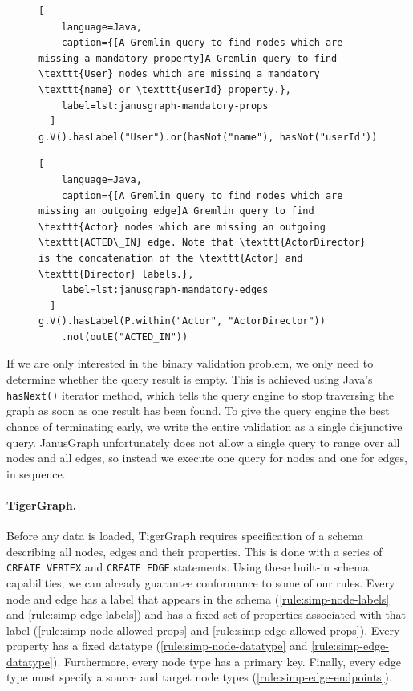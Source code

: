 \documentclass{report}
\theoremstyle{definition}
\begin{document}
\begin{figure}[H]
  \begin{lstlisting}[
    language=Java,
    caption={[A Gremlin query to find nodes which are missing a mandatory property]A Gremlin query to find \texttt{User} nodes which are missing a mandatory \texttt{name} or \texttt{userId} property.},
    label=lst:janusgraph-mandatory-props
  ]
g.V().hasLabel("User").or(hasNot("name"), hasNot("userId"))
  \end{lstlisting}
\end{figure}
\vspace*{-8pt}
\begin{figure}[H]
  \begin{lstlisting}[
    language=Java,
    caption={[A Gremlin query to find nodes which are missing an outgoing edge]A Gremlin query to find \texttt{Actor} nodes which are missing an outgoing \texttt{ACTED\_IN} edge. Note that \texttt{ActorDirector} is the concatenation of the \texttt{Actor} and \texttt{Director} labels.},
    label=lst:janusgraph-mandatory-edges
  ]
g.V().hasLabel(P.within("Actor", "ActorDirector"))
    .not(outE("ACTED_IN"))
  \end{lstlisting}
\end{figure}

If we are only interested in the binary validation problem, we only need to determine whether the query result is empty. This is achieved using Java's \texttt{hasNext()} iterator method, which tells the query engine to stop traversing the graph as soon as one result has been found. To give the query engine the best chance of terminating early, we write the entire validation as a single disjunctive query. JanusGraph unfortunately does not allow a single query to range over all nodes and all edges, so instead we execute one query for nodes and one for edges, in sequence.

\paragraph{TigerGraph.} Before any data is loaded, TigerGraph requires specification of a schema describing all nodes, edges and their properties. This is done with a series of \texttt{CREATE VERTEX} and \texttt{CREATE EDGE} statements. Using these built-in schema capabilities, we can already guarantee conformance to some of our rules. Every node and edge has a label that appears in the schema (\autoref{rule:simp-node-labels} and \ref{rule:simp-edge-labels}) and has a fixed set of properties associated with that label (\autoref{rule:simp-node-allowed-props} and \ref{rule:simp-edge-allowed-props}). Every property has a fixed datatype (\autoref{rule:simp-node-datatype} and \ref{rule:simp-edge-datatype}). Furthermore, every node type has a primary key. Finally, every edge type must specify a source and target node types (\autoref{rule:simp-edge-endpoints}).
\end{document}
